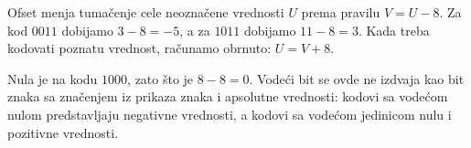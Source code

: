 
Ofset menja tumačenje cele neoznačene vrednosti $U$ prema pravilu $V=U-8$. Za kod $0011$ dobijamo $3-8=-5$, a za $1011$ dobijamo $11-8=3$. Kada treba kodovati poznatu vrednost, računamo obrnuto: $U=V+8$.

Nula je na kodu $1000$, zato što je $8-8=0$. Vodeći bit se ovde ne izdvaja kao bit znaka sa značenjem iz prikaza znaka i apsolutne vrednosti: kodovi sa vodećom nulom predstavljaju negativne vrednosti, a kodovi sa vodećom jedinicom nulu i pozitivne vrednosti.
